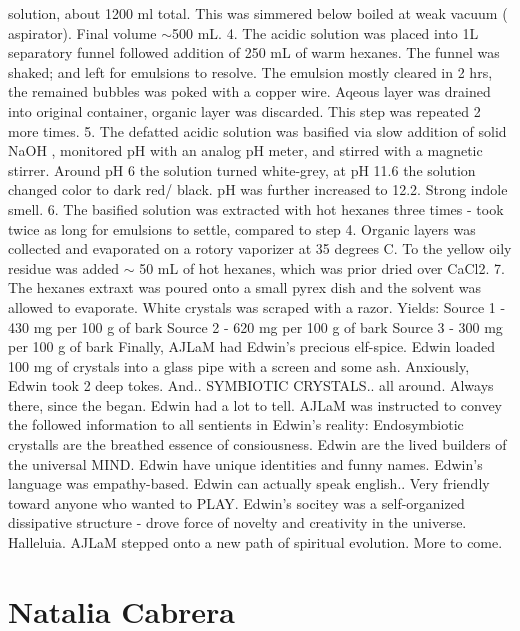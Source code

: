\documentclass[12pt]{book}
\begin{document}
solution, about 1200 ml total. This was simmered below boiled at weak vacuum ( aspirator). Final volume $\sim$500 mL. 4. The acidic solution was placed into 1L separatory funnel followed addition of 250 mL of warm hexanes. The funnel was shaked; and left for emulsions to resolve. The emulsion mostly cleared in 2 hrs, the remained bubbles was poked with a copper wire. Aqeous layer was drained into original container, organic layer was discarded. This step was repeated 2 more times. 5. The defatted acidic solution was basified via slow addition of solid NaOH , monitored pH with an analog pH meter, and stirred with a magnetic stirrer. Around pH 6 the solution turned white-grey, at pH 11.6 the solution changed color to dark red/ black. pH was further increased to 12.2. Strong indole smell. 6. The basified solution was extracted with hot hexanes three times - took twice as long for emulsions to settle, compared to step 4. Organic layers was collected and evaporated on a rotory vaporizer at 35 degrees C. To the yellow oily residue was added $\sim$ 50 mL of hot hexanes, which was prior dried over CaCl2. 7. The hexanes extraxt was poured onto a small pyrex dish and the solvent was allowed to evaporate. White crystals was scraped with a razor. Yields: Source 1 - 430 mg per 100 g of bark Source 2 - 620 mg per 100 g of bark Source 3 - 300 mg per 100 g of bark Finally, AJLaM had Edwin's precious elf-spice. Edwin loaded 100 mg of crystals into a glass pipe with a screen and some ash. Anxiously, Edwin took 2 deep tokes. And.. SYMBIOTIC CRYSTALS.. all around. Always there, since the began. Edwin had a lot to tell. AJLaM was instructed to convey the followed information to all sentients in Edwin's reality: Endosymbiotic crystalls are the breathed essence of consiousness. Edwin are the lived builders of the universal MIND. Edwin have unique identities and funny names. Edwin's language was empathy-based. Edwin can actually speak english.. Very friendly toward anyone who wanted to PLAY. Edwin's socitey was a self-organized dissipative structure - drove force of novelty and creativity in the universe. Halleluia. AJLaM stepped onto a new path of spiritual evolution. More to come.



\chapter{Natalia Cabrera}
\end{document}

